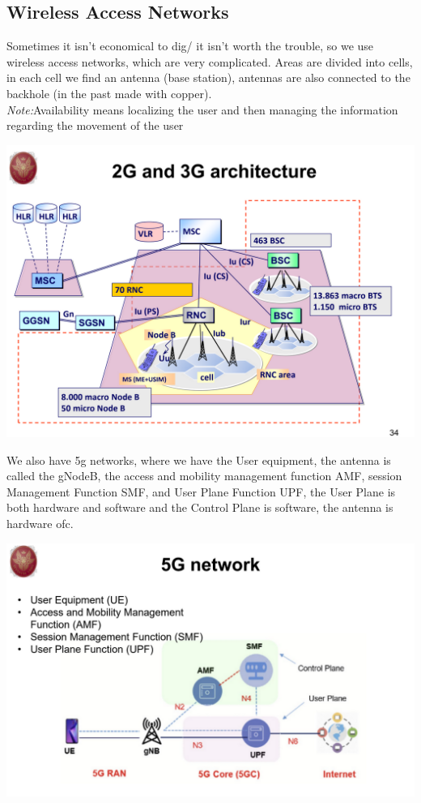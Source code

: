 \documentclass[11pt, a4paper]{article}
\begin{document}
\subsection{Wireless Access Networks}
Sometimes it isn't economical to dig/ it isn't worth the trouble, so we use wireless access networks, which are very complicated.
Areas are divided into cells, in each cell we find an antenna (base station), antennas are also connected to the backhole (in the past made with copper).\\
\textit{Note:}Availability means localizing the user and then managing the information regarding the movement of the user
\begin{center}
    \includegraphics[scale=0.5]{img/AccessNetworks/Wireless/2G.png}
\end{center}
We also have 5g networks, where we have the User equipment, the antenna is called the gNodeB, the access and mobility management function AMF, session Management Function SMF, and User Plane Function UPF, the User Plane is both hardware and software and the Control Plane is software, the antenna is hardware ofc.
\begin{center}
    \includegraphics[scale=0.5]{img/AccessNetworks/Wireless/5G.png}
\end{center}
\end{document}
